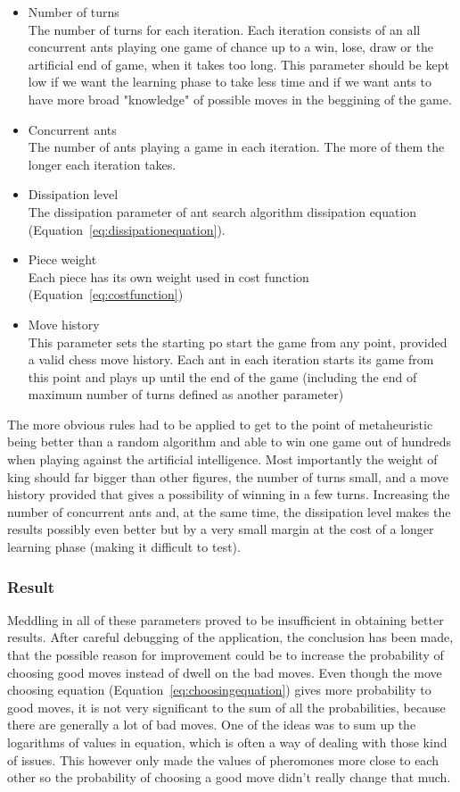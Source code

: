 \documentclass[pdftex]{article}
\begin{document}
\begin{itemize}
 	\item Number of turns \hfill \\
The number of turns for each iteration. Each iteration consists of an all concurrent ants playing one game of chance up to a win, lose, draw or the artificial end of game, when it takes too long. This parameter should be kept low if we want the learning phase to take less time and if we want ants to have more broad "knowledge" of possible moves in the beggining of the game. 
	\item Concurrent ants \hfill \\
The number of ants playing a game in each iteration. The more of them the longer each iteration takes.
 	\item Dissipation level \hfill \\
The dissipation parameter of ant search algorithm dissipation equation (Equation~\ref{eq:dissipationequation}).
	\item Piece weight \hfill \\
Each piece has its own weight used in cost function (Equation~\ref{eq:costfunction})
	\item Move history \hfill \\
This parameter sets the starting po start the game from any point, provided a valid chess move history. Each ant in each iteration starts its game from this point and plays up until the end of the game (including the end of maximum number of turns defined as another parameter)
\end{itemize}

The more obvious rules had to be applied to get to the point of metaheuristic being better than a random algorithm and able to win one game out of hundreds when playing against the artificial intelligence. Most importantly the weight of king should far bigger than other figures, the number of turns small, and a move history provided that gives a possibility of winning in a few turns. Increasing the number of concurrent ants and, at the same time, the dissipation level makes the results possibly even better but by a very small margin at the cost of a longer learning phase (making it difficult to test).


\subsubsection{Result}

Meddling in all of these parameters proved to be insufficient in obtaining better results. After careful debugging of the application, the conclusion has been made, that the possible reason for improvement could be to increase the probability of choosing good moves instead of dwell on the bad moves. Even though the move choosing equation (Equation~\ref{eq:choosingequation}) gives more probability to good moves, it is not very significant to the sum of all the probabilities, because there are generally a lot of bad moves. One of the ideas was to sum up the logarithms of values in equation, which is often a way of dealing with those kind of issues. This however only made the values of pheromones more close to each other so the probability of choosing a good move didn't really change that much. 
\end{document}

